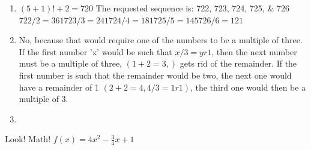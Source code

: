 \documentclass[12pt]{exam}
\begin{document}
\begin{enumerate}
\item $(5+1)! + 2 = 720$ 
The requested sequence is: 722, 723, 724, 725, & 726
$722 / 2 = 361
723 / 3 = 241
724 / 4 = 181
725 / 5 = 145
726 / 6 = 121$

\item No, because that would require one of the numbers to be a multiple of three. 
If the first number 'x' would be such that $x / 3 = y r 1$, then the next number must be a multiple of three, $( 1 + 2 = 3,)$ gets rid of the remainder.
If the first number is such that the remainder would be two, the next one would have a remainder of 1 $(2 + 2 = 4, 4 / 3 = 1 r 1)$, the third one would then be a multiple of 3.

\item 



\end{enumerate}

Look! Math! $f(x)=4x^2 - \frac{3}{4}x +1$ %
\end{document}
